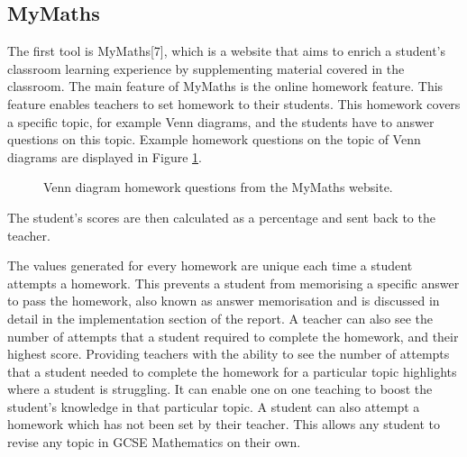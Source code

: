 \documentclass{article}
\begin{document}
\subsection{MyMaths}

The first tool is MyMaths[7], which is a website that aims to enrich a student's classroom learning experience by supplementing material covered in the classroom. The main feature of MyMaths is the online homework feature. This feature enables teachers to set homework to their students. This homework covers a specific topic, for example Venn diagrams, and the students have to answer questions on this topic. Example homework questions on the topic of Venn diagrams are displayed in Figure \ref{figure:mymathsHomeworkQuestion1}.

\begin{figure}[H]
	\centering
	\caption{Venn diagram homework questions from the MyMaths website.}
	\label{figure:mymathsHomeworkQuestion1}
\end{figure}

The student's scores are then calculated as a percentage and sent back to the teacher. \par

The values generated for every homework are unique each time a student attempts a homework. This prevents a student from memorising a specific answer to pass the homework, also known as answer memorisation and is discussed in detail in the implementation section of the report. A teacher can also see the number of attempts that a student required to complete the homework, and their highest score. Providing teachers with the ability to see the number of attempts that a student needed to complete the homework for a particular topic highlights where a student is struggling. It can enable one on one teaching to boost the student's knowledge in that particular topic. A student can also attempt a homework which has not been set by their teacher. This allows any student to revise any topic in GCSE Mathematics on their own. \par
\end{document}
